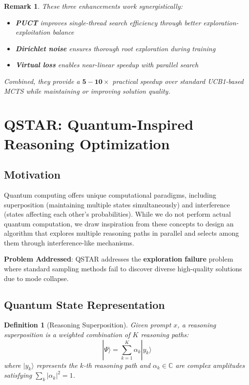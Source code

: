 \documentclass[11pt,a4paper]{article}
\newtheorem{definition}[theorem]{Definition}
\newtheorem{remark}[theorem]{Remark}
\begin{document}
\begin{remark}
These three enhancements work synergistically:
\begin{itemize}
    \item \textbf{PUCT} improves single-thread search efficiency through better exploration-exploitation balance
    \item \textbf{Dirichlet noise} ensures thorough root exploration during training
    \item \textbf{Virtual loss} enables near-linear speedup with parallel search
\end{itemize}
Combined, they provide a $\mathbf{5-10\times}$ practical speedup over standard UCB1-based MCTS while maintaining or improving solution quality.
\end{remark}

\section{QSTAR: Quantum-Inspired Reasoning Optimization}

\subsection{Motivation}

Quantum computing offers unique computational paradigms, including superposition (maintaining multiple states simultaneously) and interference (states affecting each other's probabilities). While we do not perform actual quantum computation, we draw inspiration from these concepts to design an algorithm that explores multiple reasoning paths in parallel and selects among them through interference-like mechanisms.

\textbf{Problem Addressed}: QSTAR addresses the \textbf{exploration failure} problem where standard sampling methods fail to discover diverse high-quality solutions due to mode collapse.

\subsection{Quantum State Representation}

\begin{definition}[Reasoning Superposition]
Given prompt $x$, a reasoning superposition is a weighted combination of $K$ reasoning paths:
\begin{equation}
    |\Psi\rangle = \sum_{k=1}^K \alpha_k |y_k\rangle
\end{equation}
where $|y_k\rangle$ represents the $k$-th reasoning path and $\alpha_k \in \mathbb{C}$ are complex amplitudes satisfying $\sum_k |\alpha_k|^2 = 1$.
\end{definition}
\end{document}
